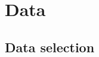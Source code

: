 \documentclass[12pt]{article}
\begin{document}





\newpage


\appendix
\section{Data}
\subsection{Data selection}
\end{document}
